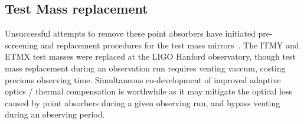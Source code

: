 \subsection{Test Mass replacement}
Unsuccessful attempts to remove these point absorbers have initiated pre-screening and replacement procedures for the test mass mirrors~\cite{buikema:2020}. The ITMY and ETMX test masses were replaced at the LIGO Hanford observatory, though test mass replacement during an observation run requires venting vaccum, costing precious observing time. Simultaneous co-development of improved adaptive optics / thermal compensation is worthwhile as it may mitigate the optical loss caused by point absorbers during a given observing run, and bypass venting during an observing period.   







